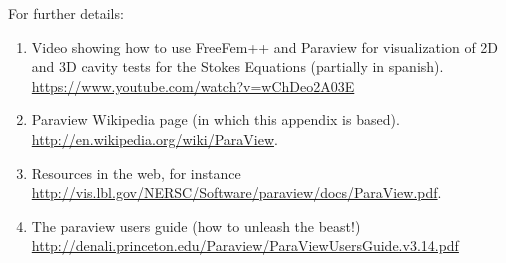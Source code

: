 \documentclass[12pt]{article}
\begin{document}
\bigskip

For further details:
\begin{enumerate}
\item Video showing how to use FreeFem++ and Paraview for
  visualization of 2D and 3D cavity tests for the Stokes Equations
  (partially in
  spanish). \url{https://www.youtube.com/watch?v=wChDeo2A03E}
\item Paraview Wikipedia page (in which this appendix is
  based). \url{http://en.wikipedia.org/wiki/ParaView}.
\item Resources in the web, for instance
  \url{http://vis.lbl.gov/NERSC/Software/paraview/docs/ParaView.pdf}.
\item The paraview users guide (how to unleash the beast!)
  \url{http://denali.princeton.edu/Paraview/ParaViewUsersGuide.v3.14.pdf}
\end{enumerate}
\end{document}
